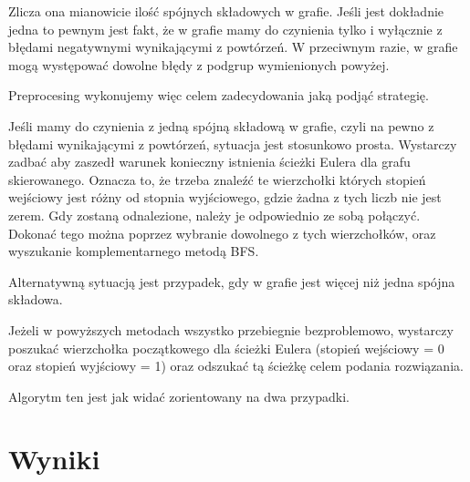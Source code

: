 \documentclass[a4paper]{article}
\begin{document}
\begin{itemize}
Zlicza ona mianowicie ilość spójnych składowych w grafie. Jeśli jest dokładnie jedna to pewnym jest fakt, że w grafie
mamy do czynienia tylko i wyłącznie z błędami negatywnymi wynikającymi z powtórzeń. W przeciwnym razie, w grafie
mogą występować dowolne błędy z podgrup wymienionych powyżej.

Preprocesing wykonujemy więc celem zadecydowania jaką podjąć strategię.

Jeśli mamy do czynienia z jedną spójną składową w grafie, czyli na pewno z błędami wynikającymi z powtórzeń, sytuacja jest
stosunkowo prosta. Wystarczy zadbać aby zaszedł warunek konieczny istnienia ścieżki Eulera dla grafu skierowanego. 
Oznacza to, że trzeba znaleźć te wierzchołki których stopień wejściowy jest różny od stopnia wyjściowego, gdzie żadna
z tych liczb nie jest zerem. Gdy zostaną odnalezione, należy je odpowiednio ze sobą połączyć. Dokonać tego można poprzez
wybranie dowolnego z tych wierzchołków, oraz wyszukanie komplementarnego metodą BFS.

Alternatywną sytuacją jest przypadek, gdy w grafie jest więcej niż jedna spójna składowa. %

Jeżeli w powyższych metodach wszystko przebiegnie bezproblemowo, wystarczy poszukać wierzchołka początkowego dla ścieżki
Eulera (stopień wejściowy = 0 oraz stopień wyjściowy = 1) oraz odszukać tą ścieżkę celem podania rozwiązania.

Algorytm ten jest jak widać zorientowany na dwa przypadki. %

\section{Wyniki}



\end{itemize}
\end{document}
